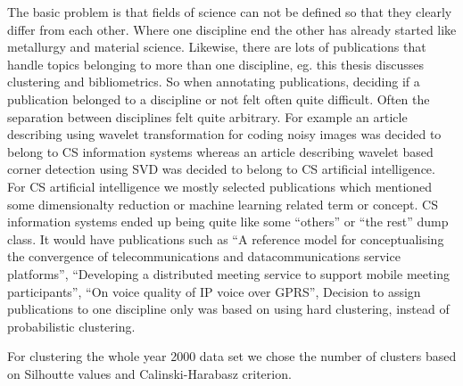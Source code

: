 The basic problem is that fields of science can not be 
defined so that they clearly differ from each other. Where one 
discipline end the other has already started like metallurgy and 
material science. Likewise, there are lots of publications that 
handle topics belonging to more than one discipline, eg. this 
thesis discusses clustering and bibliometrics. So when annotating 
publications, deciding if a publication belonged to
a discipline or not felt often quite difficult. Often the 
separation between disciplines felt quite arbitrary. For example
an article describing using wavelet transformation for coding noisy
images was decided to belong to CS information systems whereas an
article describing wavelet based corner detection using SVD was
decided to belong to CS artificial intelligence.
For CS artificial intelligence we mostly selected publications 
which mentioned some dimensionalty reduction or machine learning 
related term or concept. CS information systems ended up being 
quite like some ``others'' or ``the rest'' dump class.
It would have publications such as
``A reference model for conceptualising the convergence of 
telecommunications and datacommunications service platforms'',
``Developing a distributed meeting service to support mobile 
meeting participants'',
``On voice quality of IP voice over GPRS'',
Decision to assign publications to one discipline only was based 
on using hard clustering, instead of probabilistic clustering. 

For clustering the whole year 2000 data set we chose the number 
of clusters based on Silhoutte values and Calinski-Harabasz 
criterion.



